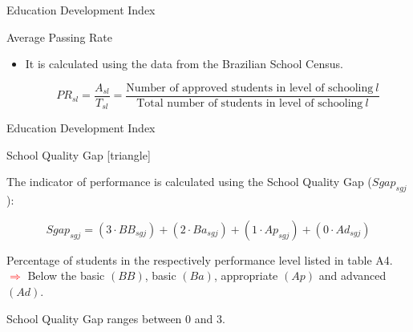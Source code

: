 \documentclass{beamer}
\begin{document}
\begin{frame}[label=IndPerf]{Education Development Index}
\begin{block}{\centering Average Passing Rate}
\begin{itemize}
\item [\sbt] \scriptsize It is calculated using the data from the Brazilian School Census.

\begin{equation} \label{eq:PassingRate}
PR_{sl} = \frac{A_{sl}}{T_{sl}} = \frac{\text{Number of approved students in level of schooling} \: l}{\text{Total number of students in level of schooling} \: l}
\end{equation}
\end{itemize}
\end{block}
\end{frame}



\begin{frame}[label=SARESP]{Education Development Index}
\vspace{-34pt} \flushright \hyperlink{Mirror}{\beamerbutton{\textcolor{red}{Mirror}}}
\vspace{20pt}
\begin{block}{\centering School Quality Gap}
[triangle]
\begin{itemize} 
{\scriptsize\item The indicator of performance is calculated using the School Quality Gap ($Sgap_{sgj}$):}


\vspace{-20pt}
\begin{equation} \label{eq:Sgap}
Sgap_{sgj} = (3 \cdot BB_{sgj}) + (2 \cdot Ba_{sgj}) + (1 \cdot Ap_{sgj}) + (0 \cdot Ad_{sgj}) \nonumber
\end{equation}


\item [\sbt] \scriptsize Percentage of students in the respectively performance level listed in table A4. 
\\ \tiny\textcolor{red}{$\Longrightarrow$} Below the basic $(BB)$, basic $(Ba)$, appropriate $(Ap)$ and advanced $(Ad)$.
\item [\sbt] \scriptsize School Quality Gap ranges between $0$ and $3$.
\end{itemize}
\end{block}


\end{frame}
\end{document}
